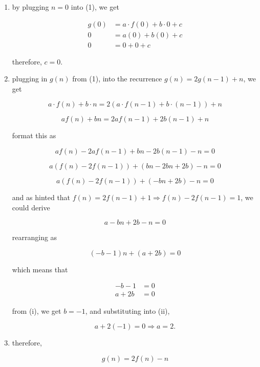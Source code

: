 \documentclass{article}
\theoremstyle{remark}
\begin{document}
\begin{enumerate}
    \item[(i)] by plugging $n = 0$ into (1), we get

        \begin{align*}
            g(0) &= a \cdot f(0) + b \cdot 0 + c \\
            0 &= a(0) + b(0) + c \\
            0 &= 0 + 0 + c
        \end{align*}

        therefore, $\boxed{c = 0}$.

    \item[(ii)] plugging in $g(n)$ from (1), into the recurrence $g(n) = 2g(n-1) + n$, we get

        \[
        a \cdot f(n) + b \cdot n = 2\left(a \cdot f(n-1) + b \cdot (n-1)\right) + n
        \]

        \[
        af(n) + bn = 2af(n-1) + 2b(n-1) + n
        \]


        format this as

        \[
        af(n) - 2af(n-1) + bn - 2b(n-1) - n = 0
        \]

        \[
        a(f(n) - 2f(n-1)) + (bn - 2bn + 2b) - n = 0
        \]

        \[
        a(f(n) - 2f(n-1)) + (-bn + 2b) - n = 0
        \]

        and as hinted that $f(n) = 2f(n-1) + 1 \Rightarrow f(n) - 2f(n-1) = 1$, we could derive

        \[
        a - bn + 2b - n = 0
        \]

        rearranging as

        \[
        (-b - 1)n + (a + 2b) = 0
        \]

        which means that 

        \begin{align}
        -b - 1 &= 0 \tag{i} \\
        a + 2b &= 0 \tag{ii}
        \end{align}

        from (i), we get $\boxed{b = -1}$, and substituting into (ii),

        \[
        a + 2(-1) = 0 \Rightarrow \boxed{a = 2}.
        \]

    \item[(iii)] therefore,

        \[
        \boxed{g(n) = 2f(n) - n}
        \]


\end{enumerate}
\end{document}
